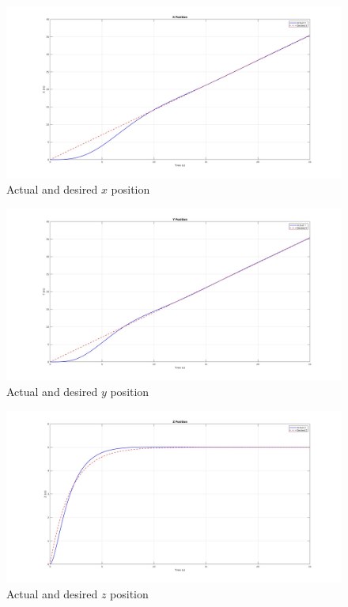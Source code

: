 \begin{figure}[h!]
    \centering
     \includegraphics[width=1\textwidth]{images/pd_x.jpg}
    \caption[Caption for Figure 3]{Actual and desired $x$ position}
    \label{fig:pid_x}
\end{figure}
\begin{figure}[h!]
    \centering
     \includegraphics[width=1\textwidth]{images/pd_y.jpg}
    \caption[Caption for Figure 4]{Actual and desired $y$ position}
    \label{fig:pid_y}
\end{figure}
\begin{figure}[h!]
    \centering
     \includegraphics[width=1\textwidth]{images/pd_z.jpg}
    \caption[Caption for Figure 5]{Actual and desired $z$ position}
    \label{fig:pid_z}
\end{figure}

